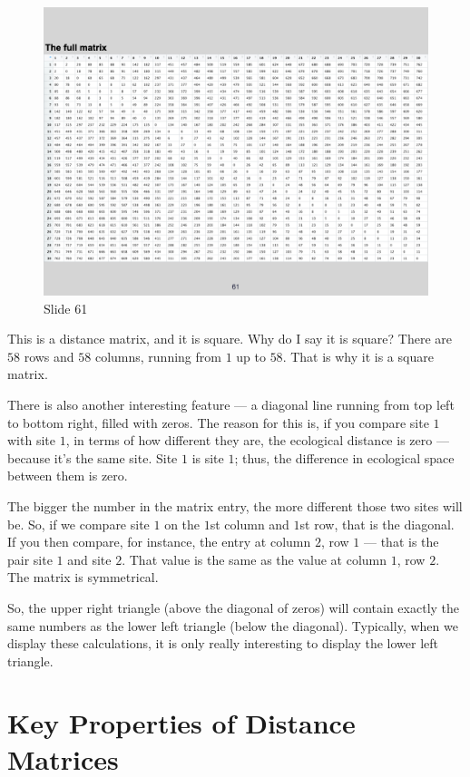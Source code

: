 \documentclass[
  12pt,
]{book}
\begin{document}
\begin{figure}[ht]
\centering
\includegraphics[width=0.8\linewidth]{../images/BDC334/BDC334-061.jpeg}
\caption*{Slide 61}
\end{figure}

This is a distance matrix, and it is square. Why do I say it is square?
There are \(58\) rows and \(58\) columns, running from \(1\) up to
\(58\). That is why it is a square matrix.

There is also another interesting feature --- a diagonal line running
from top left to bottom right, filled with zeros. The reason for this
is, if you compare site \(1\) with site \(1\), in terms of how different
they are, the ecological distance is zero --- because it's the same
site. Site \(1\) is site \(1\); thus, the difference in ecological space
between them is zero.

The bigger the number in the matrix entry, the more different those two
sites will be. So, if we compare site \(1\) on the \(1\)st column and
\(1\)st row, that is the diagonal. If you then compare, for instance,
the entry at column \(2\), row \(1\) --- that is the pair site \(1\) and
site \(2\). That value is the same as the value at column \(1\), row
\(2\). The matrix is symmetrical.

So, the upper right triangle (above the diagonal of zeros) will contain
exactly the same numbers as the lower left triangle (below the
diagonal). Typically, when we display these calculations, it is only
really interesting to display the lower left triangle.

\section{Key Properties of Distance
Matrices}\label{key-properties-of-distance-matrices}
\end{document}
